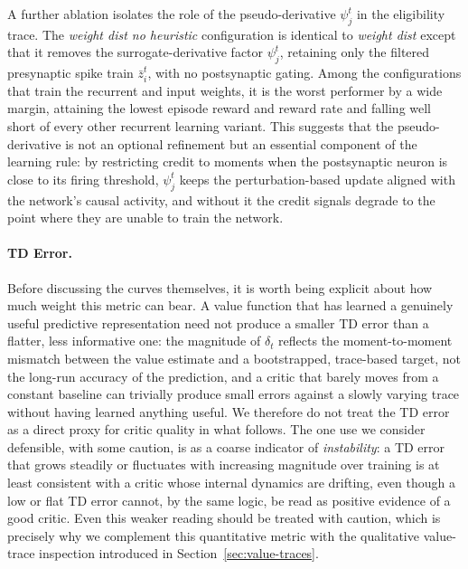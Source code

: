 A further ablation isolates the role of the pseudo-derivative $\psi^t_j$ in the eligibility
trace. The \emph{weight dist no heuristic} configuration is identical to \emph{weight dist} except that it removes the surrogate-derivative factor $\psi^t_j$, retaining only the
filtered presynaptic spike train $\bar{z}^t_i$, with no postsynaptic
gating. Among the configurations that train the recurrent and input weights, it is the worst
performer by a wide margin, attaining the lowest episode reward and reward rate and falling
well short of every other recurrent learning variant. This suggests that the pseudo-derivative is not an
optional refinement but an essential component of the learning rule: by restricting credit to
moments when the postsynaptic neuron is close to its firing threshold, $\psi^t_j$ keeps the
perturbation-based update aligned with the network's causal activity, and without it the credit
signals degrade to the point where they are unable to train the network.

\paragraph{TD Error.}
Before discussing the curves themselves, it is worth being explicit about how much weight
this metric can bear. A value function that has learned a genuinely useful predictive representation need not produce
a smaller TD error than a flatter, less informative one: the magnitude of $\delta_t$ reflects
the moment-to-moment mismatch between the value estimate and a bootstrapped, trace-based
target, not the long-run accuracy of the prediction, and a critic that barely moves from a
constant baseline can trivially produce small errors against a slowly varying trace without
having learned anything useful. We therefore do not treat the TD error as a direct proxy for
critic quality in what follows. The one use we consider defensible, with some caution, is as a
coarse indicator of \emph{instability}: a TD error that grows steadily or fluctuates with
increasing magnitude over training is at least consistent with a critic whose internal
dynamics are drifting, even though a low or flat TD error cannot, by the
same logic, be read as positive evidence of a good critic. Even this weaker reading should be
treated with caution, which is precisely why we
complement this quantitative metric with the qualitative value-trace inspection introduced in Section~\ref{sec:value-traces}.

